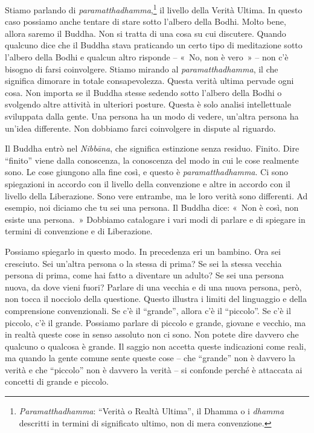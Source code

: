 Stiamo parlando di \emph{paramatthadhamma},\footnote{\emph{Paramatthadhamma}:
  ``Verità o Realtà Ultima'', il Dhamma o i \emph{dhamma} descritti in
  termini di significato ultimo, non di mera convenzione.} il livello
della Verità Ultima. In questo caso possiamo anche tentare di stare
sotto l'albero della Bodhi. Molto bene, allora saremo il Buddha. Non si
tratta di una cosa su cui discutere. Quando qualcuno dice che il Buddha
stava praticando un certo tipo di meditazione sotto l'albero della Bodhi
e qualcun altro risponde -- «~No, non è vero~» -- non c'è bisogno di
farsi coinvolgere. Stiamo mirando al \emph{paramatthadhamma}, il che
significa dimorare in totale consapevolezza. Questa verità ultima
pervade ogni cosa. Non importa se il Buddha stesse sedendo sotto
l'albero della Bodhi o svolgendo altre attività in ulteriori posture.
Questa è solo analisi intellettuale sviluppata dalla gente. Una persona
ha un modo di vedere, un'altra persona ha un'idea differente. Non
dobbiamo farci coinvolgere in dispute al riguardo.

Il Buddha entrò nel \emph{Nibbāna}, che significa estinzione senza
residuo. Finito. Dire ``finito'' viene dalla conoscenza, la conoscenza
del modo in cui le cose realmente sono. Le cose giungono alla fine così,
e questo è \emph{paramatthadhamma}. Ci sono spiegazioni in accordo con
il livello della convenzione e altre in accordo con il livello della
Liberazione. Sono vere entrambe, ma le loro verità sono differenti. Ad
esempio, noi diciamo che tu sei una persona. Il Buddha dice: «~Non è
così, non esiste una persona.~» Dobbiamo catalogare i vari modi di
parlare e di spiegare in termini di convenzione e di Liberazione.

Possiamo spiegarlo in questo modo. In precedenza eri un bambino. Ora sei
cresciuto. Sei un'altra persona o la stessa di prima? Se sei la stessa
vecchia persona di prima, come hai fatto a diventare un adulto? Se sei
una persona nuova, da dove vieni fuori? Parlare di una vecchia e di una
nuova persona, però, non tocca il nocciolo della questione. Questo
illustra i limiti del linguaggio e della comprensione convenzionali. Se
c'è il ``grande'', allora c'è il ``piccolo''. Se c'è il piccolo, c'è il
grande. Possiamo parlare di piccolo e grande, giovane e vecchio, ma in
realtà queste cose in senso assoluto non ci sono. Non potete dire
davvero che qualcuno o qualcosa è grande. Il saggio non accetta queste
indicazioni come reali, ma quando la gente comune sente queste cose --
che ``grande'' non è davvero la verità e che ``piccolo'' non è davvero
la verità -- si confonde perché è attaccata ai concetti di grande e
piccolo.

